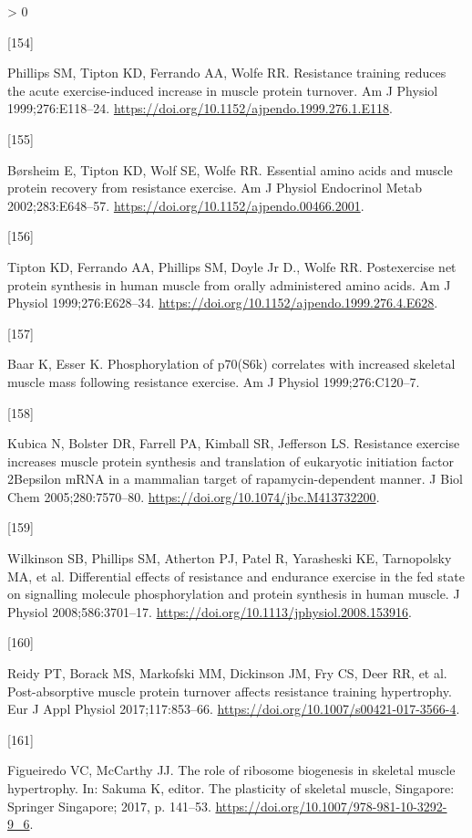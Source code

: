 \documentclass[twoside,10pt]{gihclass} %
\newlength{\cslhangindent}
\newlength{\csllabelwidth}
\newenvironment{CSLReferences}[3] %
 {%
  \setlength{\parindent}{0pt}
  \ifodd #1 \everypar{\setlength{\hangindent}{\cslhangindent}}\ignorespaces\fi
  \ifnum #2 > 0
  \setlength{\parskip}{#2\baselineskip}
  \fi
 }%
 {}
\newcommand{\CSLLeftMargin}[1]{\parbox[t]{\maxof{\widthof{#1}}{\csllabelwidth}}{#1}}
\newcommand{\CSLRightInline}[1]{\parbox[t]{\linewidth}{#1}}
\begin{document}
\begin{CSLReferences}{0}{0}
\leavevmode\hypertarget{ref-RN2713}{}%
\CSLLeftMargin{{[}154{]} }
\CSLRightInline{Phillips SM, Tipton KD, Ferrando AA, Wolfe RR. Resistance training reduces the acute exercise-induced increase in muscle protein turnover. Am J Physiol 1999;276:E118--24. \url{https://doi.org/10.1152/ajpendo.1999.276.1.E118}.}

\leavevmode\hypertarget{ref-RN2714}{}%
\CSLLeftMargin{{[}155{]} }
\CSLRightInline{Børsheim E, Tipton KD, Wolf SE, Wolfe RR. Essential amino acids and muscle protein recovery from resistance exercise. Am J Physiol Endocrinol Metab 2002;283:E648--57. \url{https://doi.org/10.1152/ajpendo.00466.2001}.}

\leavevmode\hypertarget{ref-RN2715}{}%
\CSLLeftMargin{{[}156{]} }
\CSLRightInline{Tipton KD, Ferrando AA, Phillips SM, Doyle Jr D., Wolfe RR. Postexercise net protein synthesis in human muscle from orally administered amino acids. Am J Physiol 1999;276:E628--34. \url{https://doi.org/10.1152/ajpendo.1999.276.4.E628}.}

\leavevmode\hypertarget{ref-RN866}{}%
\CSLLeftMargin{{[}157{]} }
\CSLRightInline{Baar K, Esser K. Phosphorylation of p70(S6k) correlates with increased skeletal muscle mass following resistance exercise. Am J Physiol 1999;276:C120--7.}

\leavevmode\hypertarget{ref-RN860}{}%
\CSLLeftMargin{{[}158{]} }
\CSLRightInline{Kubica N, Bolster DR, Farrell PA, Kimball SR, Jefferson LS. Resistance exercise increases muscle protein synthesis and translation of eukaryotic initiation factor 2Bepsilon mRNA in a mammalian target of rapamycin-dependent manner. J Biol Chem 2005;280:7570--80. \url{https://doi.org/10.1074/jbc.M413732200}.}

\leavevmode\hypertarget{ref-RN1866}{}%
\CSLLeftMargin{{[}159{]} }
\CSLRightInline{Wilkinson SB, Phillips SM, Atherton PJ, Patel R, Yarasheski KE, Tarnopolsky MA, et al. Differential effects of resistance and endurance exercise in the fed state on signalling molecule phosphorylation and protein synthesis in human muscle. J Physiol 2008;586:3701--17. \url{https://doi.org/10.1113/jphysiol.2008.153916}.}

\leavevmode\hypertarget{ref-RN1897}{}%
\CSLLeftMargin{{[}160{]} }
\CSLRightInline{Reidy PT, Borack MS, Markofski MM, Dickinson JM, Fry CS, Deer RR, et al. Post-absorptive muscle protein turnover affects resistance training hypertrophy. Eur J Appl Physiol 2017;117:853--66. \url{https://doi.org/10.1007/s00421-017-3566-4}.}

\leavevmode\hypertarget{ref-RN1912}{}%
\CSLLeftMargin{{[}161{]} }
\CSLRightInline{Figueiredo VC, McCarthy JJ. The role of ribosome biogenesis in skeletal muscle hypertrophy. In: Sakuma K, editor. The plasticity of skeletal muscle, Singapore: Springer Singapore; 2017, p. 141--53. \url{https://doi.org/10.1007/978-981-10-3292-9_6}.}


\end{CSLReferences}
\end{document}

